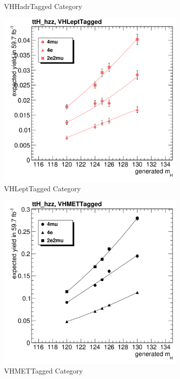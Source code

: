 \begin{figure}[h]
\begin{subfigure}[b]{0.3\textwidth}
         \caption{VHHadrTagged Category}
     \end{subfigure}
     \hfill
     \begin{subfigure}[b]{0.3\textwidth}
         \includegraphics[width=\textwidth]{images/cFits_ttH_hzz_VHLeptTagged_.png}
         \caption{VHLeptTagged Category}
     \end{subfigure}
      \hfill
     \begin{subfigure}[b]{0.3\textwidth}
        
         \includegraphics[width=\textwidth]{images/cFits_ttH_hzz_VHMETTagged_.png}
         \caption{VHMETTagged Category}
     \end{subfigure}
       \hfill
        \begin{subfigure}[b]{0.3\textwidth}
         

\end{subfigure}
\end{figure}
